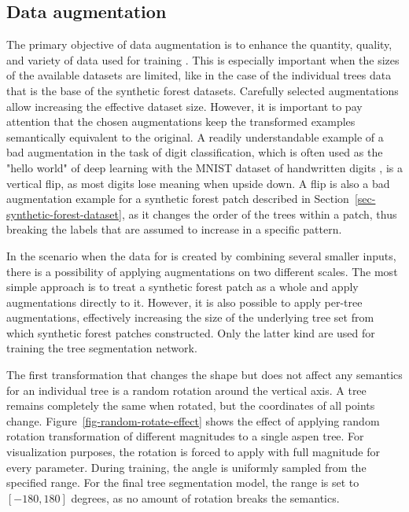 \subsection{Data augmentation}\label{sec-augmentations}

The primary objective of data augmentation is to enhance the quantity, quality, and variety of data used for training \citep{mumuniDataAugmentationComprehensive2022}.
This is especially important when the sizes of the available datasets are limited, like in the case of the individual trees data that is the base of the synthetic forest datasets.
Carefully selected augmentations allow increasing the effective dataset size.
However, it is important to pay attention that the chosen augmentations keep the transformed examples semantically equivalent to the original.
A readily understandable example of a bad augmentation in the task of digit classification, which is often used as the "hello world" of deep learning with the MNIST dataset of handwritten digits \citep{deng2012mnist}, is a vertical flip, as most digits lose meaning when upside down.
A flip is also a bad augmentation example for a synthetic forest patch described in Section~\ref{sec-synthetic-forest-dataset}, as it changes the order of the trees within a patch, thus breaking the labels that are assumed to increase in a specific pattern.

In the scenario when the data for is created by combining several smaller inputs, there is a possibility of applying augmentations on two different scales.
The most simple approach is to treat a synthetic forest patch as a whole and apply augmentations directly to it.
However, it is also possible to apply per-tree augmentations, effectively increasing the size of the underlying tree set from which synthetic forest patches constructed.
Only the latter kind are used for training the tree segmentation network.

The first transformation that changes the shape but does not affect any semantics for an individual tree is a random rotation around the vertical axis.
A tree remains completely the same when rotated, but the coordinates of all points change.
Figure~\ref{fig-random-rotate-effect} shows the effect of applying random rotation transformation of different magnitudes to a single aspen tree.
For visualization purposes, the rotation is forced to apply with full magnitude for every parameter.
During training, the angle is uniformly sampled from the specified range.
For the final tree segmentation model, the range is set to $[-180, 180]$ degrees, as no amount of rotation breaks the semantics.

